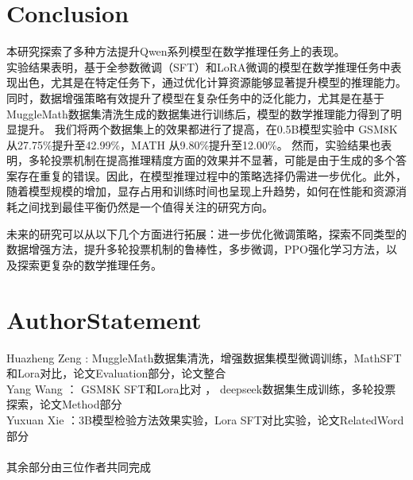 \documentclass{article}
\begin{document}
  






\section{Conclusion}

本研究探索了多种方法提升Qwen系列模型在数学推理任务上的表现。\\
实验结果表明，基于全参数微调（SFT）和LoRA微调的模型在数学推理任务中表现出色，尤其是在特定任务下，通过优化计算资源能够显著提升模型的推理能力。同时，数据增强策略有效提升了模型在复杂任务中的泛化能力，尤其是在基于MuggleMath数据集清洗生成的数据集进行训练后，模型的数学推理能力得到了明显提升。
我们将两个数据集上的效果都进行了提高，在0.5B模型实验中 GSM8K 从27.75\%提升至42.99\%，MATH 从9.80\%提升至12.00\%。
然而，实验结果也表明，多轮投票机制在提高推理精度方面的效果并不显著，可能是由于生成的多个答案存在重复的错误。因此，在模型推理过程中的策略选择仍需进一步优化。此外，随着模型规模的增加，显存占用和训练时间也呈现上升趋势，如何在性能和资源消耗之间找到最佳平衡仍然是一个值得关注的研究方向。

未来的研究可以从以下几个方面进行拓展：进一步优化微调策略，探索不同类型的数据增强方法，提升多轮投票机制的鲁棒性，多步微调，PPO强化学习方法，以及探索更复杂的数学推理任务。
\section{AuthorStatement}

Huazheng Zeng : MuggleMath数据集清洗，增强数据集模型微调训练，MathSFT和Lora对比，论文Evaluation部分，论文整合\\
Yang Wang ： GSM8K SFT和Lora比对 ， deepseek数据集生成训练，多轮投票探索，论文Method部分\\
Yuxuan Xie ：3B模型检验方法效果实验，Lora SFT对比实验，论文RelatedWord部分\\
\\其余部分由三位作者共同完成






\end{document}
